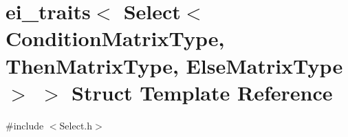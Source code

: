 \hypertarget{structei__traits_3_01_select_3_01_condition_matrix_type_00_01_then_matrix_type_00_01_else_matrix_type_01_4_01_4}{\section{ei\-\_\-traits$<$ Select$<$ Condition\-Matrix\-Type, Then\-Matrix\-Type, Else\-Matrix\-Type $>$ $>$ Struct Template Reference}
\label{structei__traits_3_01_select_3_01_condition_matrix_type_00_01_then_matrix_type_00_01_else_matrix_type_01_4_01_4}
}


{\ttfamily \#include $<$Select.\-h$>$}

